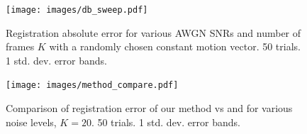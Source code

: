 \documentclass{article}
\begin{document}
\begin{figure}[htb]
  \begin{minipage}[b]{1\linewidth}
    \centering
    \centerline{\texttt{[image: images/db\_sweep.pdf]}}
  \end{minipage}
  \caption{Registration absolute error for various AWGN SNRs and number of frames $K$ with a randomly chosen constant motion vector. 50 trials. 1 std. dev. error bands.}
  \label{fig:db_sweep}
\end{figure}

\begin{figure}[htb]
  \begin{minipage}[b]{1\linewidth}
    \centering
    \centerline{\texttt{[image: images/method\_compare.pdf]}}
  \end{minipage}
  \caption{Comparison of registration error of our method vs \cite{ginsburg2013bolocam} and \cite{guizar2008efficient} for various noise levels, $K=20$. 50 trials.  1 std. dev. error bands.}
  \label{fig:method_compare}
\end{figure}

\clearpage
\vfill\pagebreak



\end{document}
